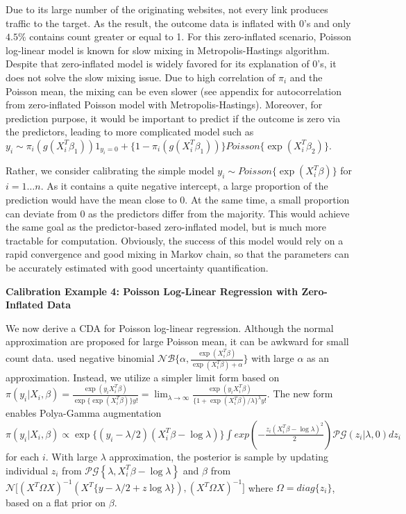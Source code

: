 \documentclass[10pt]{article}
\begin{document}
Due to its large number of the originating websites, not every link produces traffic to the target. As the result, the outcome data is inflated with $0$'s and  only $4.5\%$ contains count greater or equal to 1. For this zero-inflated scenario, Poisson log-linear model is known for slow mixing in Metropolis-Hastings algorithm. Despite that zero-inflated model is widely favored for its explanation of $0$'s, it does not solve the slow mixing issue.  Due to high correlation of $\pi_i$ and the Poisson mean, the mixing can be even slower (see appendix for autocorrelation from zero-inflated Poisson model with Metropolis-Hastings). Moreover, for prediction purpose, it would be important to predict if the outcome is zero via the predictors, leading to more complicated model such as $y_i\sim \pi_i(g(X_i^T\beta_1))  1_{y_i=0}+ \{ 1-\pi_i(g(X_i^T\beta_1)) \} Poisson\{\exp (X_i^T \beta_2)\}$.

Rather, we consider calibrating the simple model $y_i\sim Poisson\{\exp(X_i^T\beta)\}$ for $i=1\ldots n$. As it contains a quite negative intercept, a large proportion of the prediction would have the mean close to $0$. At the same time, a small proportion can deviate from $0$ as the predictors differ from the majority. This would achieve the same goal as the predictor-based zero-inflated model, but is much more tractable for computation. Obviously, the success of this model would rely on a rapid convergence and good mixing in Markov chain, so that the parameters can be accurately estimated with good uncertainty quantification.

{\bf Calibration Example 4: Poisson Log-Linear Regression with Zero-Inflated Data}

We now derive a CDA for Poisson log-linear regression. Although the normal approximation are proposed for large Poisson mean, it can be awkward for small count data. \cite{zhou2012lognormal} used negative binomial $\mathcal{NB}\{ \alpha,\frac{\exp(X_i^T\beta)}{\exp(X_i^T\beta)+\alpha}\}$ with large $\alpha$ as an approximation. Instead, we utilize a simpler limit form based on $\pi(y_i|X_i,\beta)=\frac{ \exp(y_i X_i^T\beta)}{\exp\{\exp(X_i^T\beta)\}y!} =\lim_{\lambda\rightarrow\infty}\frac{\exp(y_i X_i^T\beta)}{\{1+ \exp(X_i^T\beta)/\lambda\}^{\lambda}y!}$. The new form enables Polya-Gamma augmentation $ \pi(y_i|X_i,\beta) \propto \exp\{(y_i-\lambda/2)(X_i^T\beta-\log \lambda)\}\int exp(- \frac{z_i (X_i^T\beta-\log \lambda)^2}{2})\mathcal{PG}(z_i|\lambda, 0)d z_i$ for each $i$. With large $\lambda$ approximation, the posterior is sample by updating individual $z_i$ from $\mathcal{PG}\left\{\lambda, X_i^T\beta-\log \lambda\right\}$ and $\beta$ from $\mathcal{N}\big[ (X^T \Omega X )^{-1} (X^T  \big \{ y - \lambda/2 + z \log \lambda \big\} ),(X^T \Omega X )^{-1} \big]$ where $\Omega=diag\{z_i\}$, based on a flat prior on $\beta$.
\end{document}
